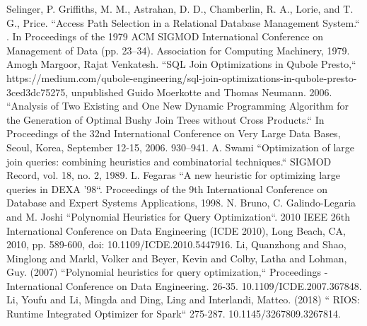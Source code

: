 \documentclass[conference]{IEEEtran}
\begin{document}
\begin{thebibliography}{00}
 Selinger, P. Griffiths, M. M., Astrahan, D. D., Chamberlin, R. A., Lorie, and T. G., Price. ``Access Path Selection in a Relational Database Management System.`` . In Proceedings of the 1979 ACM SIGMOD International Conference on Management of Data (pp. 23–34). Association for Computing Machinery, 1979.
 Amogh Margoor, Rajat Venkatesh. ``SQL Join Optimizations in Qubole Presto,``
https://medium.com/qubole-engineering/sql-join-optimizations-in-qubole-presto-3ced3dc75275, unpublished
 Guido Moerkotte and Thomas Neumann. 2006. ``Analysis of Two Existing and One New Dynamic Programming Algorithm for the Generation of Optimal Bushy Join Trees without Cross Products.`` In Proceedings of the 32nd International Conference on Very Large Data Bases, Seoul, Korea, September 12-15, 2006. 930–941.
 A. Swami ``Optimization of large join queries: combining heuristics and
combinatorial techniques.`` SIGMOD Record, vol. 18, no. 2, 1989.
 L. Fegaras ``A new heuristic for optimizing large queries in DEXA ’98``. Proceedings of the 9th International Conference on Database and Expert Systems Applications, 1998.
 N. Bruno, C. Galindo-Legaria and M. Joshi ``Polynomial Heuristics for Query Optimization``. 2010 IEEE 26th International Conference on Data Engineering (ICDE 2010), Long Beach, CA, 2010, pp. 589-600, doi: 10.1109/ICDE.2010.5447916.
 Li, Quanzhong and Shao, Minglong and Markl, Volker and Beyer, Kevin and Colby, Latha and Lohman, Guy. (2007)  ``Polynomial heuristics for query optimization,`` Proceedings - International Conference on Data Engineering. 26-35. 10.1109/ICDE.2007.367848.
 Li, Youfu and Li, Mingda and Ding, Ling and Interlandi, Matteo. (2018)  `` RIOS: Runtime Integrated Optimizer for Spark`` 275-287. 10.1145/3267809.3267814.
\end{thebibliography}
\end{document}
